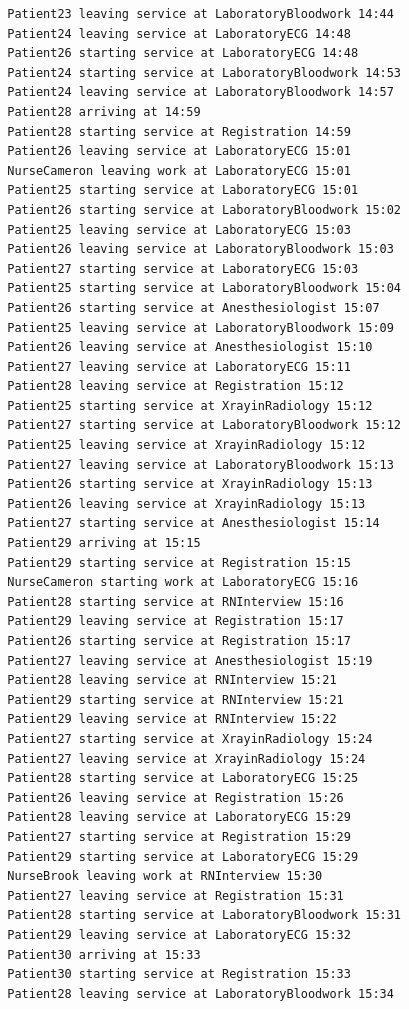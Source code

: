 \documentclass[12pt]{article}
\begin{document}
\begin{verbatim}
		Patient23 leaving service at LaboratoryBloodwork 14:44
		Patient24 leaving service at LaboratoryECG 14:48
		Patient26 starting service at LaboratoryECG 14:48
		Patient24 starting service at LaboratoryBloodwork 14:53
		Patient24 leaving service at LaboratoryBloodwork 14:57
		Patient28 arriving at 14:59
		Patient28 starting service at Registration 14:59
		Patient26 leaving service at LaboratoryECG 15:01
		NurseCameron leaving work at LaboratoryECG 15:01
		Patient25 starting service at LaboratoryECG 15:01
		Patient26 starting service at LaboratoryBloodwork 15:02
		Patient25 leaving service at LaboratoryECG 15:03
		Patient26 leaving service at LaboratoryBloodwork 15:03
		Patient27 starting service at LaboratoryECG 15:03
		Patient25 starting service at LaboratoryBloodwork 15:04
		Patient26 starting service at Anesthesiologist 15:07
		Patient25 leaving service at LaboratoryBloodwork 15:09
		Patient26 leaving service at Anesthesiologist 15:10
		Patient27 leaving service at LaboratoryECG 15:11
		Patient28 leaving service at Registration 15:12
		Patient25 starting service at XrayinRadiology 15:12
		Patient27 starting service at LaboratoryBloodwork 15:12
		Patient25 leaving service at XrayinRadiology 15:12
		Patient27 leaving service at LaboratoryBloodwork 15:13
		Patient26 starting service at XrayinRadiology 15:13
		Patient26 leaving service at XrayinRadiology 15:13
		Patient27 starting service at Anesthesiologist 15:14
		Patient29 arriving at 15:15
		Patient29 starting service at Registration 15:15
		NurseCameron starting work at LaboratoryECG 15:16
		Patient28 starting service at RNInterview 15:16
		Patient29 leaving service at Registration 15:17
		Patient26 starting service at Registration 15:17
		Patient27 leaving service at Anesthesiologist 15:19
		Patient28 leaving service at RNInterview 15:21
		Patient29 starting service at RNInterview 15:21
		Patient29 leaving service at RNInterview 15:22
		Patient27 starting service at XrayinRadiology 15:24
		Patient27 leaving service at XrayinRadiology 15:24
		Patient28 starting service at LaboratoryECG 15:25
		Patient26 leaving service at Registration 15:26
		Patient28 leaving service at LaboratoryECG 15:29
		Patient27 starting service at Registration 15:29
		Patient29 starting service at LaboratoryECG 15:29
		NurseBrook leaving work at RNInterview 15:30
		Patient27 leaving service at Registration 15:31
		Patient28 starting service at LaboratoryBloodwork 15:31
		Patient29 leaving service at LaboratoryECG 15:32
		Patient30 arriving at 15:33
		Patient30 starting service at Registration 15:33
		Patient28 leaving service at LaboratoryBloodwork 15:34

\end{verbatim}
\end{document}
